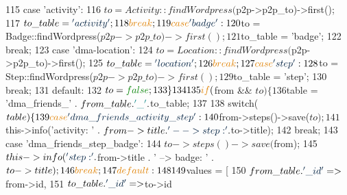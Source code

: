 \begin{DoxyCode}
115                 \textcolor{keywordflow}{case} \textcolor{stringliteral}{'activity'}:
116                     $to = Activity::findWordpress($p2p->p2p\_to)->first();
117                     $to\_table = \textcolor{stringliteral}{'activity'};
118                     \textcolor{keywordflow}{break};
119                 \textcolor{keywordflow}{case} \textcolor{stringliteral}{'badge'}:
120                     $to = Badge::findWordpress($p2p->p2p\_to)->first();
121                     $to\_table = \textcolor{stringliteral}{'badge'};
122                     \textcolor{keywordflow}{break};
123                 \textcolor{keywordflow}{case} \textcolor{stringliteral}{'dma-location'}:
124                     $to = Location::findWordpress($p2p->p2p\_to)->first();
125                     $to\_table = \textcolor{stringliteral}{'location'};
126                     \textcolor{keywordflow}{break};
127                 \textcolor{keywordflow}{case} \textcolor{stringliteral}{'step'}:
128                     $to = Step::findWordpress($p2p->p2p\_to)->first();
129                     $to\_table = \textcolor{stringliteral}{'step'}; 
130                     \textcolor{keywordflow}{break};
131                 \textcolor{keywordflow}{default}:
132                     $to = \textcolor{keyword}{false};
133             \}
134 
135             \textcolor{keywordflow}{if} ($from && $to) \{
136                 $table = \textcolor{stringliteral}{'dma\_friends\_'} . $from\_table . \textcolor{charliteral}{'\_'} . $to\_table;
137 
138                 \textcolor{keywordflow}{switch}($table) \{
139                     \textcolor{keywordflow}{case} \textcolor{stringliteral}{'dma\_friends\_activity\_step'}:
140                         $from->steps()->save($to);
141                         $this->info(\textcolor{stringliteral}{'activity: '} . $from->title . \textcolor{stringliteral}{' --> step: '} . $to->title);
142                         \textcolor{keywordflow}{break};
143                     \textcolor{keywordflow}{case} \textcolor{stringliteral}{'dma\_friends\_step\_badge'}:
144                         $to->steps()->save($from);
145                         $this->info(\textcolor{stringliteral}{'step: '} . $from->title . \textcolor{stringliteral}{' --> badge: '} . $to->title);
146                         \textcolor{keywordflow}{break};
147                     \textcolor{keywordflow}{default}:
148 
149                         $values = [
150                             $from\_table . \textcolor{stringliteral}{'\_id'}   => $from->id,
151                             $to\_table . \textcolor{stringliteral}{'\_id'}     => $to->id

\end{DoxyCode}
